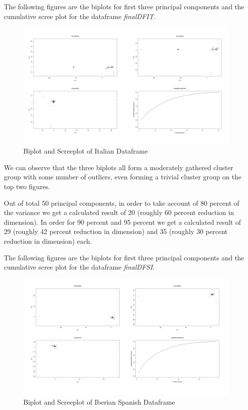 The following figures are the biplots for first three principal components and the cumulative scree plot for the dataframe \emph{finalDFIT}.

\begin{figure}[H]
    \centering
    \includegraphics[width=15cm]{images/PCA/4plotIT.png}
    \caption{Biplot and Screeplot of Italian Dataframe}
    \label{fig:4plotIT} 
\end{figure}

We can observe that the three biplots all form a moderately gathered cluster group with some number of outliers, even forming a trivial cluster group on the top two figures.

Out of total 50 principal components, in order to take account of 80 percent of the variance we get a calculated result of 20 (roughly 60 percent reduction in dimension). In order for 90 percent and 95 percent we get a calculated result of 29 (roughly 42 percent reduction in dimension) and 35 (roughly 30 percent reduction in dimension) each. 

The following figures are the biplots for first three principal components and the cumulative scree plot for the dataframe \emph{finalDFSI}.

\begin{figure}[H]
    \centering
    \includegraphics[width=15cm]{images/PCA/4plotSI.png}
    \caption{Biplot and Screeplot of Iberian Spanish Dataframe}
    \label{fig:4plotSI} 
\end{figure}

